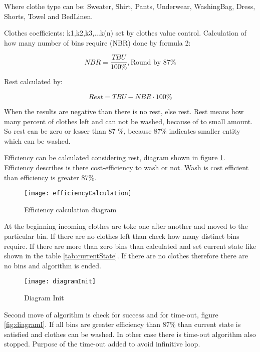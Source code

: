Where clothe type can be: Sweater, Shirt, Pants, Underwear, WashingBag, Dress, Shorts, Towel and BedLinen. 

Clothes coefficients: k1,k2,k3,...k(n) set by clothes value control.
Calculation of how many number of bins require (NBR) done by formula 2:  

\begin{equation}
NBR=\frac{TBU}{100\%},\textrm{Round by 87\%} \label{eq:eq2}
\end{equation}


Rest calculated by:

\begin{equation}
Rest=TBU-NBR\cdot 100\% \label{eq:eq3}
\end{equation}

When the results are negative than there is no rest, else rest. Rest means how many percent of clothes left and can not be washed, because of to small amount. So rest can be zero or lesser than 87 \%, because 87\% indicates smaller entity which can be washed.


Efficiency can be calculated considering rest, diagram shown in figure \ref{fig:efficiencyCalculation}. Efficiency describes is there cost-efficiency to wash or not. Wash is cost efficient than efficiency is greater 87\%.


\begin{figure}[h]
	\centering
		\texttt{[image: efficiencyCalculation]}
	\caption{Efficiency calculation diagram}
	\label{fig:efficiencyCalculation}
\end{figure}

At the beginning incoming clothes are toke one after another and moved to the particular bin. If there are no clothes left than check how many distinct bins require. If there are more than zero bins than calculated and set current state like shown in the table \ref{tab:currentState}. If there are no clothes therefore there are no bins and algorithm is ended. \newpage

\begin{figure}[h]
	\centering
		\texttt{[image: diagramInit]}
	\caption{Diagram Init}
	\label{fig:planning}
\end{figure}


Second move of algorithm is check for success and for time-out, figure \ref{fig:diagramI}. If all bins are greater efficiency than 87\% than current state is satisfied and clothes can be washed. In other case there is time-out algorithm also stopped. Purpose of the time-out added to avoid infinitive loop.

